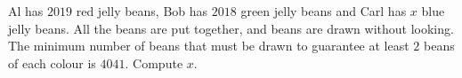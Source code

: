 Al has \(2019\) red jelly beans, Bob has \(2018\) green jelly beans and Carl has \(x\) blue jelly beans. All the beans are put together, and beans are drawn without looking. The minimum number of beans that must be drawn to guarantee at least \(2\) beans of each colour is \(4041\). Compute \(x\).
